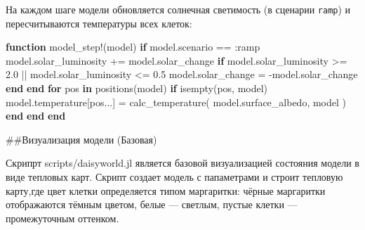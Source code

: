 \documentclass[
  12pt,
  a4paper,
  DIV=11,
  numbers=noendperiod]{scrreprt}
\newenvironment{Shaded}{\begin{snugshade}}{\end{snugshade}}
\newcommand{\BuiltInTok}[1]{\textcolor[rgb]{0.00,0.23,0.31}{#1}}
\newcommand{\CharTok}[1]{\textcolor[rgb]{0.13,0.47,0.30}{#1}}
\newcommand{\ControlFlowTok}[1]{\textcolor[rgb]{0.00,0.23,0.31}{\textbf{#1}}}
\newcommand{\FloatTok}[1]{\textcolor[rgb]{0.68,0.00,0.00}{#1}}
\newcommand{\FunctionTok}[1]{\textcolor[rgb]{0.28,0.35,0.67}{#1}}
\newcommand{\ImportTok}[1]{\textcolor[rgb]{0.00,0.46,0.62}{#1}}
\newcommand{\KeywordTok}[1]{\textcolor[rgb]{0.00,0.23,0.31}{\textbf{#1}}}
\newcommand{\NormalTok}[1]{\textcolor[rgb]{0.00,0.23,0.31}{#1}}
\newcommand{\OperatorTok}[1]{\textcolor[rgb]{0.37,0.37,0.37}{#1}}
\newcommand{\PreprocessorTok}[1]{\textcolor[rgb]{0.68,0.00,0.00}{#1}}
\newcommand{\SpecialCharTok}[1]{\textcolor[rgb]{0.37,0.37,0.37}{#1}}
\newcommand{\StringTok}[1]{\textcolor[rgb]{0.13,0.47,0.30}{#1}}
\begin{document}
На каждом шаге модели обновляется солнечная светимость (в сценарии
\texttt{ramp}) и пересчитываются температуры всех клеток:

\begin{Shaded}
\begin{Highlighting}[]
\KeywordTok{function} \FunctionTok{model\_step!}\NormalTok{(model)}
    \ControlFlowTok{if}\NormalTok{ model.scenario }\OperatorTok{==} \OperatorTok{:}\NormalTok{ramp}
\NormalTok{        model.solar\_luminosity }\OperatorTok{+=}\NormalTok{ model.solar\_change}
        \ControlFlowTok{if}\NormalTok{ model.solar\_luminosity }\OperatorTok{\textgreater{}=} \FloatTok{2.0} \OperatorTok{||}
\NormalTok{                model.solar\_luminosity }\OperatorTok{\textless{}=} \FloatTok{0.5}
\NormalTok{            model.solar\_change }\OperatorTok{=} \OperatorTok{{-}}\NormalTok{model.solar\_change}
        \ControlFlowTok{end}
    \ControlFlowTok{end}
    \ControlFlowTok{for}\NormalTok{ pos }\KeywordTok{in} \FunctionTok{positions}\NormalTok{(model)}
        \ControlFlowTok{if} \FunctionTok{isempty}\NormalTok{(pos, model)}
\NormalTok{            model.temperature[pos}\OperatorTok{...}\NormalTok{] }\OperatorTok{=} \FunctionTok{calc\_temperature}\NormalTok{(}
\NormalTok{                model.surface\_albedo, model}
\NormalTok{            )}
        \ControlFlowTok{end}
    \ControlFlowTok{end}
\KeywordTok{end}
\end{Highlighting}
\end{Shaded}

\#\#Визуализация модели (Базовая)

Скрипрт scripts/daisyworld.jl является базовой визуализацией состояния
модели в виде тепловых карт. Скрипт создает модель с папаметрами и
строит тепловую карту,где цвет клетки определяется типом маргаритки:
чёрные маргаритки отображаются тёмным цветом, белые --- светлым, пустые
клетки --- промежуточным оттенком.

\begin{Shaded}
\end{Shaded}
\end{document}
